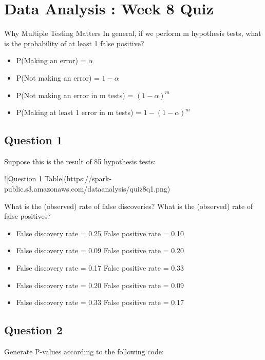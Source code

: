 \documentclass[12pt]{article}
\begin{document}
\section{Data Analysis : Week 8 Quiz}


Why Multiple Testing Matters
In general, if we perform m hypothesis tests, what is the
probability of at least 1 false positive?
\begin{itemize}
\item P(Making an error) = $\alpha$
\item P(Not making an error) = $1 - \alpha$
\item P(Not making an error in m tests) = $(1 - \alpha)^m$
\item P(Making at least 1 error in m tests) = $1 - (1 - \alpha)^m$
\end{itemize}


\subsection*{Question 1}
Suppose this is the result of 85 hypothesis tests:

![Question 1 Table](https://spark-public.s3.amazonaws.com/dataanalysis/quiz8q1.png)


What is the 
(observed) rate of false discoveries? What is the (observed) rate of
false positives?
\begin{itemize}
\item False discovery rate = 0.25 False positive rate = 0.10  
\item False discovery rate = 0.09 False positive rate = 0.20  
\item False discovery rate = 0.17 False positive rate = 0.33  
\item False discovery rate = 0.20 False positive rate = 0.09  
\item False discovery rate = 0.33 False positive rate = 0.17
\end{itemize}

\newpage
\subsection*{Question 2}
Generate P-values according to the following code:
\end{document}
